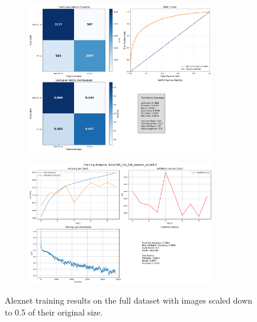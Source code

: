 \documentclass{pracalicmgr}
\begin{document}
\newpage

\begin{figure}[H]
    \centering
    \begin{subfigure}{\textwidth}
        \centering
        \includegraphics[width=0.9\textwidth]{src/AlexCNN_1ch_full_dataset_scale05.png}
        \label{fig:full5sub1}
    \end{subfigure}
    
    \vspace{1cm}
    
    \begin{subfigure}{\textwidth}
        \centering
        \includegraphics[width=0.9\textwidth]{src/AlexCNN_1ch_full_dataset_scale05loss.png}
        \label{fig:full5sub2}
    \end{subfigure}
    \caption{Alexnet training results on the full dataset with images scaled down to 0.5 of their original size.}
    \label{fig:full5stacked}
\end{figure}
\end{document}
